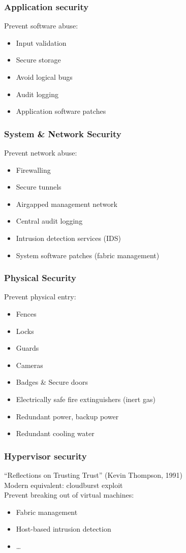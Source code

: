 \documentclass{beamer}
\begin{document}
\begin{frame}
    \frametitle{Application security}
    Prevent software abuse:
    \begin{itemize}
      \item Input validation
      \item Secure storage
      \item Avoid logical bugs
      \item Audit logging
      \item Application software patches
    \end{itemize}
\end{frame}

\begin{frame}
    \frametitle{System \& Network Security}
    Prevent network abuse:
    \begin{itemize}
      \item Firewalling
      \item Secure tunnels %
      \item Airgapped management network
      \item Central audit logging
      \item Intrusion detection services (IDS)
      \item System software patches (fabric management)
    \end{itemize}
\end{frame}

\begin{frame}
    \frametitle{Physical Security}
    Prevent physical entry:
    \begin{itemize}
      \item Fences
      \item Locks
      \item Guards
      \item Cameras
      \item Badges \& Secure doors
      \item Electrically safe fire extinguishers (inert gas)
      \item Redundant power, backup power
      \item Redundant cooling water
    \end{itemize}
\end{frame}

\begin{frame}
    \frametitle{Hypervisor security}
    ``Reflections on Trusting Trust'' (Kevin Thompson, 1991) \\
    Modern equivalent: cloudburst exploit \\
    Prevent breaking out of virtual machines:
    \begin{itemize}
      \item Fabric management
      \item Host-based intrusion detection
      \item \dots
    \end{itemize}
\end{frame}
\end{document}
